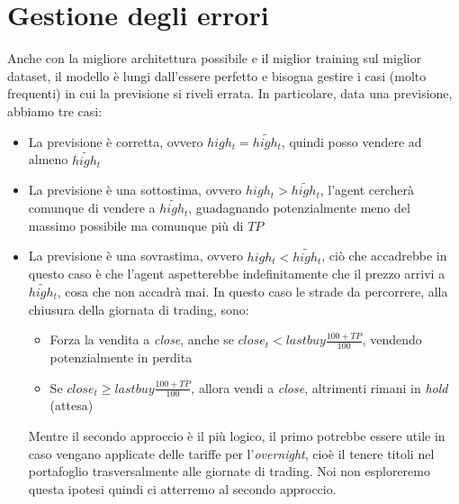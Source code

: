 \documentclass[binding=0.6cm]{sapthesis}
\begin{document}
		\section{Gestione degli errori}
			Anche con la migliore architettura possibile e il miglior training sul miglior dataset, il modello è lungi dall'essere perfetto e bisogna gestire i casi (molto frequenti) in cui la previsione si riveli
			errata. In particolare, data una previsione, abbiamo tre casi:
			\begin{itemize}
				\item La previsione è corretta, ovvero $high_t = \tilde{high_t}$, quindi posso vendere ad almeno $\tilde{high_t}$
				\item La previsione è una sottostima, ovvero $high_t > \tilde{high_t}$, l'agent cercherà comunque di vendere a $\tilde{high_t}$, guadagnando potenzialmente meno del massimo possibile ma comunque
					più di $TP$
				\item La previsione è una sovrastima, ovvero $high_t < \tilde{high_t}$, ciò che accadrebbe in questo caso è che l'agent aspetterebbe indefinitamente che il prezzo arrivi a $\tilde{high_t}$, cosa
					che non accadrà mai. In questo caso le strade da percorrere, alla chiusura della giornata di trading, sono:
					\begin{itemize}
						\item Forza la vendita a \textit{close}, anche se $close_t < lastbuy \frac{100 + TP}{100}$, vendendo potenzialmente in perdita
						\item Se $close_t \geq lastbuy \frac{100 + TP}{100}$, allora vendi a \textit{close}, altrimenti rimani in \textit{hold} (attesa)
					\end{itemize}
					Mentre il secondo approccio è il più logico, il primo potrebbe essere utile in caso vengano applicate delle tariffe per l'\textit{overnight}, cioè il tenere titoli nel portafoglio
					trasversalmente alle giornate di trading. Noi non esploreremo questa ipotesi quindi ci atterremo al secondo approccio.
			\end{itemize}
		\newpage
\end{document}
